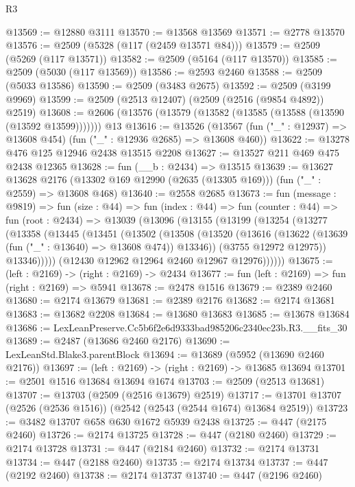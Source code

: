 \begin{lexlean}{R3}
\begin{coremodule}
@13569 := @12880 @3111
@13570 := @13568 @13569
@13571 := @2778 @13570
@13576 := @2509 (@5328 (@117 (@2459 @13571 @84)))
@13579 := @2509 (@5269 (@117 @13571))
@13582 := @2509 (@5164 (@117 @13570))
@13585 := @2509 (@5030 (@117 @13569))
@13586 := @2593 @2460
@13588 := @2509 (@5033 @13586)
@13590 := @2509 (@3483 @2675)
@13592 := @2509 (@3199 @9969)
@13599 := @2509 (@2513 @12407) (@2509 (@2516 (@9854 @4892)) @2519)
@13608 := @2606 (@13576 (@13579 (@13582 (@13585 (@13588 (@13590 (@13592 @13599))))))) @13
@13616 := @13526
    (@13567 (fun ("_" : @12937) => @13608 @454) (fun ("_" : @12936 @2685) => @13608 @460))
@13622 := @13278 @476 @125 @12946 @2438 @13515 @2208
@13627 := @13527 @211 @469 @475 @2438 @12365
@13628 := fun (__b : @2434) => @13515
@13639 := @13627
    @13628
    @2176
    (@13302 @169 @12990 (@2635 (@13305 @169)))
    (fun ("_" : @2559) => @13608 @468)
@13640 := @2558 @2685
@13673 := fun (message : @9819) =>
  fun (size : @44) =>
  fun (index : @44) =>
  fun (counter : @44) =>
  fun (root : @2434) =>
  @13039
    (@13096
      (@13155
        (@13199
          (@13254
            (@13277
              (@13358
                (@13445
                  (@13451
                    (@13502
                      (@13508
                        (@13520
                          (@13616 (@13622 (@13639 (fun ("_" : @13640) => @13608 @474)) @13346))
                          (@3755 @12972 @12975))
                        @13346)))))
              (@12430 @12962 @12964 @2460 @12967 @12976))))))
@13675 := (left : @2169) -> (right : @2169) -> @2434
@13677 := fun (left : @2169) => fun (right : @2169) => @5941
@13678 := @2478 @1516
@13679 := @2389 @2460
@13680 := @2174 @13679
@13681 := @2389 @2176
@13682 := @2174 @13681
@13683 := @13682 @2208
@13684 := @13680 @13683
@13685 := @13678 @13684
@13686 := LexLeanPreserve.Cc5b6f2e6d9333bad985206c2340ec23b.R3.__fits_30
@13689 := @2487 (@13686 @2460 @2176)
@13690 := LexLeanStd.Blake3.parentBlock
@13694 := @13689 (@5952 (@13690 @2460 @2176))
@13697 := (left : @2169) -> (right : @2169) -> @13685 @13694
@13701 := @2501 @1516 @13684 @13694 @1674
@13703 := @2509 (@2513 @13681)
@13707 := @13703 (@2509 (@2516 @13679) @2519)
@13717 := @13701 @13707 (@2526 (@2536 @1516)) (@2542 (@2543 (@2544 @1674) @13684 @2519))
@13723 := @3482 @13707 @658 @630 @1672 @5939 @2438
@13725 := @447 (@2175 @2460)
@13726 := @2174 @13725
@13728 := @447 (@2180 @2460)
@13729 := @2174 @13728
@13731 := @447 (@2184 @2460)
@13732 := @2174 @13731
@13734 := @447 (@2188 @2460)
@13735 := @2174 @13734
@13737 := @447 (@2192 @2460)
@13738 := @2174 @13737
@13740 := @447 (@2196 @2460)

\end{coremodule}
\end{lexlean}
